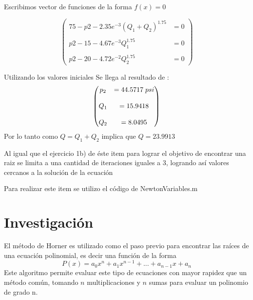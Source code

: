 \documentclass{udparticle}
\begin{document}
\begin{enumerate}
    Escribimos vector de funciones de la forma $f(x) = 0$

   $$\begin{pmatrix}
        75 - p2 - 2.35e^{-3}(Q_1+Q_2)^{1.75} &= 0 \\
        \\
        p2 - 15 - 4.67e^{-3}Q_1^{1.75} &= 0  \\
        \\
        p2 - 20 - 4.72e^{-2}Q_2^{1.75} &= 0
    \end{pmatrix}$$
    
    Utilizando los valores iniciales Se llega al resultado de : 
    $$\begin{pmatrix}
        p_2 &=44.5717 \hspace{0.1cm} psi \\
        \\
        Q_1 &=15.9418 \\
        \\
        Q_2 &=8.0495
    \end{pmatrix}$$
    Por lo tanto como $Q = Q_1 + Q_2 $ implica que $ Q = 23.9913 $
    
    Al igual que el ejercicio 1b) de éste item para lograr el objetivo de encontrar una raiz se limita a una cantidad de iteraciones iguales a 3, logrando así valores cercanos a la solución de la ecuación
    
    Para realizar este item se utilizo el código de NewtonVariables.m
    \end{enumerate}
    \newpage
    \section{Investigación}
    El método de Horner es utilizado como el paso previo para encontrar las raíces de una ecuación polinomial, es decir una función de la forma $$P(x)=a_{0}x^{n}+a_{1}x^{n-1}+...+a_{n-1}x+a_{n}$$
    Este algoritmo permite evaluar este tipo de ecuaciones con mayor rapidez que un método común, tomando $n$ multiplicaciones y $n$ sumas para evaluar un polinomio de grado n.
    
\end{document}
